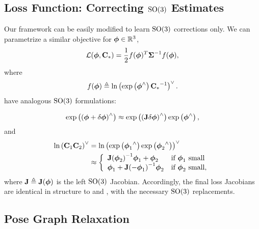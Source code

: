 \subsection{Loss Function: Correcting $\mathrm{SO}(3)$ Estimates}
Our framework can be easily modified to learn $\mathrm{SO}(3)$ corrections only. We can parametrize a similar objective for $\boldsymbol{\mathbf{\phi}} \in \mathbb{R}^3$,
\begin{equation}
	\label{eq:so3loss_fn}
\mathcal{L} (\boldsymbol{\mathbf{\phi}}, \boldsymbol{\mathbf{C}}_*) = \frac{1}{2} f({\boldsymbol{\mathbf{\phi}}})^T {\boldsymbol{\mathbf{\Sigma}}}^{-1} f({\boldsymbol{\mathbf{\phi}}}),
\end{equation}
where 
\begin{equation}
	\label{eq:s03logmap_fn}
	f({\boldsymbol{\mathbf{\phi}}}) \triangleq \text{ln}\left({\text{exp}\left({\boldsymbol{\mathbf{\phi}}}^{\wedge}\right) {\boldsymbol{\mathbf{C}}_*}^{-1}} \right)^{\vee}.
\end{equation}
 have analogous $\mathrm{SO}(3)$ formulations:

\begin{equation}
\label{eq:delta_phi_exp}
\text{exp}\left({( \boldsymbol{\mathbf{\phi}} + \delta \boldsymbol{\mathbf{\phi}})}^{\wedge}\right) \approx \text{exp}\left({(\boldsymbol{\mathbf{J}} \delta \boldsymbol{\mathbf{\phi}})}^{\wedge}\right) \text{exp}\left({\boldsymbol{\mathbf{\phi}}}^{\wedge}\right),
\end{equation}
and
\begin{align}
\label{eq:jacobian_phi_small}
\text{ln}\left({\boldsymbol{\mathbf{C}}_1 \boldsymbol{\mathbf{C}}_2} \right)^{\vee} &= \text{ln}\left({ \text{exp}\left({\boldsymbol{\mathbf{\phi}}_1}^{\wedge}\right) \text{exp}\left({\boldsymbol{\mathbf{\phi}}_2}^{\wedge}\right) } \right)^{\vee} \nonumber \\
								  &\approx \left\{
	\begin{array}{ll}
		{  \boldsymbol{\mathbf{J}}  (  \boldsymbol{\mathbf{\phi}}  _2)}^{-1} \boldsymbol{\mathbf{\phi}}_1 + \boldsymbol{\mathbf{\phi}}_2   & \mbox{if } \boldsymbol{\mathbf{\phi}}_1 ~ \mbox{small} \\
		\boldsymbol{\mathbf{\phi}}_1 + {\boldsymbol{\mathbf{J}}(-\boldsymbol{\mathbf{\phi}}_1)}^{-1} \boldsymbol{\mathbf{\phi}}_2 & \mbox{if } \boldsymbol{\mathbf{\phi}}_2 ~ \mbox{small},
	\end{array}
\right.
\end{align}
where $\boldsymbol{\mathbf{J}} \triangleq \boldsymbol{\mathbf{J}}(\boldsymbol{\mathbf{\phi}})$ is the left $\mathrm{SO}(3)$ Jacobian. Accordingly, the final loss Jacobians are identical in structure to  and , with the necessary $\mathrm{SO}(3)$ replacements.

\subsection{Pose Graph Relaxation}

